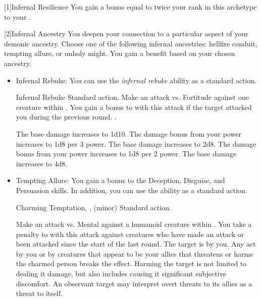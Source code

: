         [1]{Infernal Resilience} You gain a bonus equal to twice your rank in this archetype to your .

        [2]{Infernal Ancestry} You deepen your connection to a particular aspect of your demonic ancestry.
        Choose one of the following infernal ancestries: hellfire conduit, tempting allure, or unholy might.
        You gain a benefit based on your chosen ancestry.
        \begin{itemize}
            \item Infernal Rebuke: You can use the \textit{infernal rebuke} ability as a standard action.
                \begin{magicalactiveability}{Infernal Rebuke}
                    \abilityusagetime Standard action.
                    \rankline
                    Make an attack vs. Fortitude against one creature within \shortrange.
                    You gain a  bonus to  with this attack if the target attacked you during the previous round.
                    \hit {}.

                    \rankline
                     The base damage increases to 1d10.
                     The damage bonus from your power increases to 1d8 per 3 power.
                     The base damage increases to 2d8.
                     The damage bonus from your power increases to 1d8 per 2 power.
                     The base damage increases to 4d8.
                \end{magicalactiveability}
            \item Tempting Allure: You gain a  bonus to the Deception, Disguise, and Persuasion skills.
                In addition, you can use the  ability as a standard action.
                \begin{magicalsustainability}{Charming Temptation}{, ,  (minor)}
                    \abilityusagetime Standard action.
                    \rankline
                    \noindent

                    Make an attack vs. Mental against a humanoid creature within \medrange.
                    You take a  penalty to  with this attack against creatures who have made an attack or been attacked since the start of the last round.
                    \vspace{0.25em}
                    \hit The target is \charmed by you.
                    Any act by you or by creatures that appear to be your allies that threatens or harms the charmed person breaks the effect.
                    Harming the target is not limited to dealing it damage, but also includes causing it significant subjective discomfort.
                    An observant target may interpret overt threats to its allies as a threat to itself.


\end{magicalsustainability}
\end{itemize}
